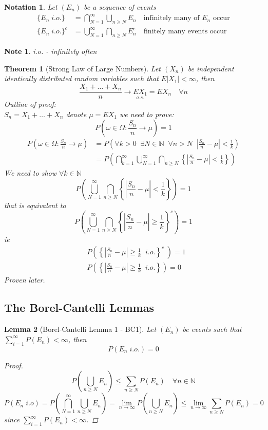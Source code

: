 \documentclass[12pt]{article}
\def\NN{\mathbb{N}}
\newtheorem{theorem}{Theorem}[section]
\newtheorem{lemma}[theorem]{Lemma}
\newtheorem*{note}{Note}
\newtheorem*{notation}{Notation}
\begin{document}
\begin{notation}Let $(E_n)$ be a sequence of events
\begin{align*}
\{E_n \; i.o.\} &=\bigcap_{N=1}^{\infty}\bigcup_{n \geq N}E_n \quad \text{infinitely many of $E_n$ occur} \\
\{E_n\; i.o.\}^{c} &= \bigcup_{N=1}^{\infty}\bigcap_{n \geq N}E_n^c \quad \text{finitely many events occur}\end{align*}
\end{notation}
\begin{note} i.o. - infinitely often \end{note}

\begin{theorem}[Strong Law of Large Numbers]
Let $(X_n)$ be independent identically distributed random variables such that $E|X_1|<\infty$, then
\[\frac{X_1 +\dots + X_n}{n} \rightarrow \underset{a.s.}{EX_1} = EX_n \quad \forall n \]
Outline of proof:\\
$S_n = X_1 + \dots + X_n$ denote $\mu = EX_1$ we need to prove:
\[P\left(\omega \in \Omega: \frac{S_n}{n} \rightarrow \mu\right) = 1\]
\begin{align*}
P\left(\omega \in \Omega: \frac{S_n}{n} \rightarrow \mu\right) &= P\left( \forall k>0 \; \; \exists N \in \NN \; \; \forall n>N \; \; \left| \frac{S_n}{n} - \mu \right|<\frac{1}{k}\right) \\ 
&= P\left(\bigcap_{k=1}^{\infty}\bigcup_{N=1}^{\infty}\bigcap_{n \geq N}\left\{ \left|\frac{S_n}{n} - \mu \right|<\frac{1}{k} \right\} \right)\end{align*}
We need to show $\forall k \in \NN$
\[P\left(\bigcup_{N=1}^{\infty}\bigcap_{n \geq N}\left\{ \left|\frac{S_n}{n} - \mu \right|<\frac{1}{k} \right\} \right) = 1\]
that is equivalent to 
\[P\left(\bigcup_{N=1}^{\infty}\bigcap_{n \geq N}\left\{ \left|\frac{S_n}{n} - \mu \right|\geq \frac{1}{k} \right\}^c \right) = 1\]
ie
\begin{align*}
&P\left(\left\{ \left|\frac{S_n}{n} - \mu \right|\geq \frac{1}{k}\; \; i.o. \right\}^c \;\right) = 1\\
&P\left(\left\{ \left|\frac{S_n}{n} - \mu \right| \geq \frac{1}{k} \; \; i.o. \right\} \right) = 0
\end{align*}
Proven later. \end{theorem}

\subsection{The Borel-Cantelli Lemmas}
\begin{lemma}[Borel-Cantelli Lemma 1 - BC1]\label{bc1}
Let $(E_n)$ be events such that $\sum\limits_{i=1}^{\infty}P(E_n) < \infty$, then 
\[P(E_n \; i.o.) = 0\]
\begin{proof}
\[P(\bigcup_{n \geq N}E_n) \leq \sum_{n \geq N}P(E_n) \quad \forall n \in \NN\]
\[P(E_n \; i.o) =P(\bigcap_{N=1}^{\infty}\bigcup_{n \geq N}E_n) = \lim_{n\rightarrow \infty}P(\bigcup_{n \geq N}E_n) \leq \lim_{n\rightarrow \infty} \sum_{n \geq N}P(E_n) = 0\]
since $\sum\limits_{i=1}^{\infty}P(E_n) < \infty$.
\end{proof}
\end{lemma}
\end{document}
